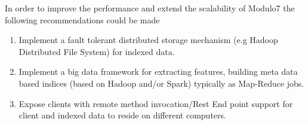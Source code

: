 \noindent In order to improve the performance and extend the scalability of Modulo7 the following recommendations could be made 

\begin{enumerate}
\item Implement a fault tolerant distributed storage mechanism (e.g Hadoop Distributed File System) for indexed data. 
\item Implement a big data framework for extracting features, building meta data based indices (based on Hadoop and/or Spark) typically as Map-Reduce jobs. 
\item Expose clients with remote method invocation/Rest End point support for client and indexed data to reside on different computers. 
\end{enumerate}